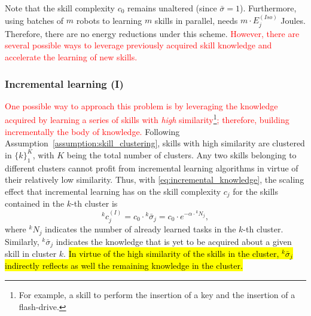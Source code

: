 Note that the skill complexity $c_0$ remains unaltered (since $\bar{\sigma} = 1$). Furthermore, using batches of $m$ robots to learning $m$ skills in parallel, needs $m\cdot E^{(Iso)}_j$ \unit[]{Joules}. Therefore, there are no energy reductions under this scheme. \textcolor{red}{However, there are several possible ways to leverage previously acquired skill knowledge and accelerate the learning of new skills.}

\subsubsection{\textbf{Incremental learning (I)}}
\textcolor{red}{One possible way to approach this problem is by leveraging the knowledge acquired by learning a series of skills with \emph{high} similarity\footnote{For example, a skill to perform the insertion of a key and the insertion of a flash-drive.}; therefore, building incrementally the body of knowledge.} Following Assumption~\ref{assumption:skill_clustering}, skills with high similarity are clustered in $\lbrace k \rbrace^{K}_1 $, with $K$ being the total number of clusters. Any two skills belonging to different clusters cannot profit from incremental learning algorithms in virtue of their relatively low similarity. Thus, with \eqref{eq:incremental_knowledge}, the scaling effect that incremental learning has on the skill complexity $c_j$ for the skills contained in the $k$-th cluster is
\begin{equation}\label{eq:complexity_TL}
  {^k}c^{(I)}_j = c_0 \cdot {^k}\bar{\sigma}_j = c_0 \cdot e^{-\alpha \cdot {^kN_{j}}},
\end{equation}
where ${^kN_{j}}$ indicates the number of already learned tasks in the $k$-th cluster. Similarly, ${^k}\bar{\sigma}_j$ indicates the knowledge that is yet to be acquired about a given skill in cluster $k$. \hl{In virtue of the high similarity of the skills in the cluster, ${^k}\bar{\sigma}_j$ indirectly reflects as well the remaining knowledge in the cluster.}

